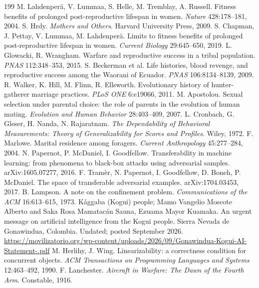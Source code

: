 \documentclass[10pt,twocolumn]{article}
\theoremstyle{plain}
\theoremstyle{definition}
\begin{document}
\begin{thebibliography}{199}
 M. Lahdenper\"a, V. Lummaa, S. Helle, M. Tremblay, A. Russell. Fitness benefits of prolonged post-reproductive lifespan in women. \emph{Nature} 428:178--181, 2004.
 S. Hrdy. \emph{Mothers and Others}. Harvard University Press, 2009.
 S. Chapman, J. Pettay, V. Lummaa, M. Lahdenper\"a. Limits to fitness benefits of prolonged post-reproductive lifespan in women. \emph{Current Biology} 29:645--650, 2019.
 L. Glowacki, R. Wrangham. Warfare and reproductive success in a tribal population. \emph{PNAS} 112:348--353, 2015.
 S. Beckerman et al. Life histories, blood revenge, and reproductive success among the Waorani of Ecuador. \emph{PNAS} 106:8134--8139, 2009.
 R. Walker, K. Hill, M. Flinn, R. Ellsworth. Evolutionary history of hunter-gatherer marriage practices. \emph{PLoS ONE} 6:e19066, 2011.
 M. Apostolou. Sexual selection under parental choice: the role of parents in the evolution of human mating. \emph{Evolution and Human Behavior} 28:403--409, 2007.
 L. Cronbach, G. Gleser, H. Nanda, N. Rajaratnam. \emph{The Dependability of Behavioral Measurements: Theory of Generalizability for Scores and Profiles}. Wiley, 1972.
 F. Marlowe. Marital residence among foragers. \emph{Current Anthropology} 45:277--284, 2004.
 N. Papernot, P. McDaniel, I. Goodfellow. Transferability in machine learning: from phenomena to black-box attacks using adversarial samples. arXiv:1605.07277, 2016.
 F. Tram\`er, N. Papernot, I. Goodfellow, D. Boneh, P. McDaniel. The space of transferable adversarial examples. arXiv:1704.03453, 2017.
 B. Lampson. A note on the confinement problem. \emph{Communications of the ACM} 16:613--615, 1973.
 K\'aggaba (Kogui) people; Mamo Vangelio Moscote Alberto and Saka Rosa Mamatac\'an Sauna, Ezuama Mayor Kuamaka. An urgent message on artificial intelligence from the Kogui people. Sierra Nevada de Gonawindua, Colombia. Undated; posted September 2026. \url{https://movilizatorio.org/wp-content/uploads/2026/09/Gonawindua-Kogui-AI-Statement-.pdf}
 M. Herlihy, J. Wing. Linearizability: a correctness condition for concurrent objects. \emph{ACM Transactions on Programming Languages and Systems} 12:463--492, 1990.
 F. Lanchester. \emph{Aircraft in Warfare: The Dawn of the Fourth Arm}. Constable, 1916.

\end{thebibliography}
\end{document}
